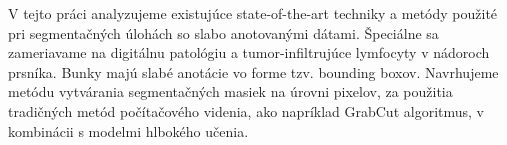 \bigskip{}

V tejto práci analyzujeme existujúce state-of-the-art techniky a metódy použité pri segmentačných úlohách so slabo anotovanými dátami. Špeciálne sa zameriavame na digitálnu patológiu a tumor-infiltrujúce lymfocyty v nádoroch prsníka. Bunky majú slabé anotácie vo forme tzv. bounding boxov. Navrhujeme metódu vytvárania segmentačných masiek na úrovni pixelov, za použitia tradičných metód počítačového videnia, ako napríklad GrabCut algoritmus, v kombinácii s modelmi hlbokého učenia.



\newpage{}\thispagestyle{empty}\medskip{}


\newpage{}

\newpage
\thispagestyle{empty}
\mbox{}
\newpage



\newpage

